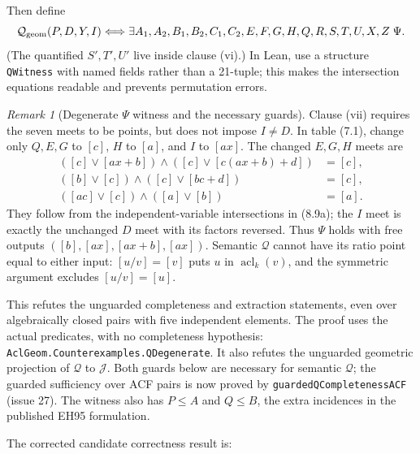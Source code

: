 \documentclass[11pt,oneside]{article}
\theoremstyle{definition}
\theoremstyle{remark}
\newtheorem{remark}[theorem]{Remark}
\newcommand{\acl}{\operatorname{acl}}
\newcommand{\Qrel}{\mathcal{Q}}
\newcommand{\Jrel}{\mathcal{J}}
\newcommand{\lean}[1]{\nolinkurl{#1}}
\begin{document}
Then define
\[
 \Qrel_{\rm geom}(P,D,Y,I)
 \Longleftrightarrow
 \exists A_1,A_2,B_1,B_2,C_1,C_2,E,F,G,H,Q,R,S,T,U,X,Z\;\Psi.
\]
(The quantified $S',T',U'$ live inside clause (vi).)  In Lean, use a structure
\lean{QWitness} with named fields rather than a 21-tuple; this makes the intersection
equations readable and prevents permutation errors.

\begin{remark}[Degenerate $\Psi$ witness and the necessary guards]\label{rem:psi-degenerate}
Clause (vii) requires the seven meets to be points, but does not impose $I\ne D$.
In table (7.1), change only $Q,E,G$ to $[c]$, $H$ to $[a]$, and $I$ to $[ax]$.
The changed $E,G,H$ meets are
\[
\begin{aligned}
([c]\vee[ax+b])\wedge([c]\vee[c(ax+b)+d])&=[c],\\
([b]\vee[c])\wedge([c]\vee[bc+d])&=[c],\\
([ac]\vee[c])\wedge([a]\vee[b])&=[a].
\end{aligned}
\]
They follow from the independent-variable intersections in (8.9a); the $I$ meet is
exactly the unchanged $D$ meet with its factors reversed.  Thus $\Psi$ holds with
free outputs $([b],[ax],[ax+b],[ax])$.  Semantic $\Qrel$ cannot have its ratio point
equal to either input: $[u/v]=[v]$ puts $u$ in $\acl_k(v)$, and the symmetric
argument excludes $[u/v]=[u]$.

This refutes the unguarded completeness and extraction statements, even over
algebraically closed pairs with five independent elements.  The proof uses the actual
predicates, with no completeness hypothesis:
\lean{AclGeom.Counterexamples.QDegenerate}.  It also refutes the unguarded geometric
projection of $\Qrel$ to $\Jrel$.  Both guards below are necessary for semantic $\Qrel$;
the guarded sufficiency over ACF pairs is now proved by \lean{guardedQCompletenessACF}
(issue 27).  The witness also has $P\leq A$ and $Q\leq B$, the extra
incidences in the published EH95 formulation.
\end{remark}

The corrected candidate correctness result is:
\end{document}
